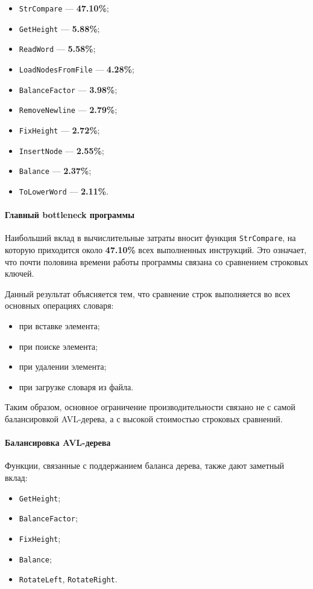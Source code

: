 \documentclass[12pt]{article}
\begin{document}
\begin{itemize}
	\item \texttt{StrCompare} — \textbf{47.10\%};
	\item \texttt{GetHeight} — \textbf{5.88\%};
	\item \texttt{ReadWord} — \textbf{5.58\%};
	\item \texttt{LoadNodesFromFile} — \textbf{4.28\%};
	\item \texttt{BalanceFactor} — \textbf{3.98\%};
	\item \texttt{RemoveNewline} — \textbf{2.79\%};
	\item \texttt{FixHeight} — \textbf{2.72\%};
	\item \texttt{InsertNode} — \textbf{2.55\%};
	\item \texttt{Balance} — \textbf{2.37\%};
	\item \texttt{ToLowerWord} — \textbf{2.11\%}.
\end{itemize}

\paragraph{Главный bottleneck программы}

Наибольший вклад в вычислительные затраты вносит функция \texttt{StrCompare}, на которую приходится около \textbf{47.10\%} всех выполненных инструкций. Это означает, что почти половина времени работы программы связана со сравнением строковых ключей.

Данный результат объясняется тем, что сравнение строк выполняется во всех основных операциях словаря:
\begin{itemize}
	\item при вставке элемента;
	\item при поиске элемента;
	\item при удалении элемента;
	\item при загрузке словаря из файла.
\end{itemize}

Таким образом, основное ограничение производительности связано не с самой балансировкой AVL-дерева, а с высокой стоимостью строковых сравнений.

\paragraph{Балансировка AVL-дерева}

Функции, связанные с поддержанием баланса дерева, также дают заметный вклад:
\begin{itemize}
	\item \texttt{GetHeight};
	\item \texttt{BalanceFactor};
	\item \texttt{FixHeight};
	\item \texttt{Balance};
	\item \texttt{RotateLeft}, \texttt{RotateRight}.
\end{itemize}
\end{document}
